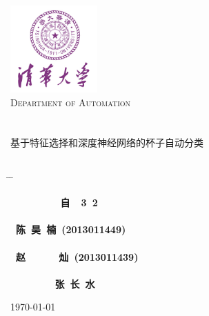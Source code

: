 
\newcommand\smallW{
\mathchoice
	{{\scriptstyle\mathcal{W}}}%
	{{\scriptstyle\mathcal{W}}}%
	{{\scriptscriptstyle\mathcal{W}}}%
	{\scalebox{.7}{$\scriptscriptstyle\mathcal{W}$}}%
}



\begin{titlepage}
\begin{center}
\includegraphics[width=0.25\textwidth]{resource/logo.jpg}\\[1cm]
\textsc{\LARGE Department of Automation}\\[1.5cm]
\\[0.5cm]
\hrulefill
\\[0.8cm]{\centering \huge \hei 基于特征选择和深度神经网络的杯子自动分类}\\[0.4cm]
\hrulefill
\\[4cm]

\begin{tabbing}       %

 \hspace*{5cm} \= \hspace{2.6cm} \= \kill

\>  {\centering\fs\sihao\textbf{~~~~~~~~~自~~3~2}} \\
\\
\>  {\centering\fs\sihao\textbf{~陈~昊~楠~(2013011449)}}\\
\\
\>  {\centering\fs\sihao\textbf{~赵~~~~~~灿~(2013011439)}}\\
\\
\>  {\centering\fs\sihao\textbf{~~~~~~~~张~长~水}} \\

\end{tabbing}
\vfill
{\large \today}
\end{center}
\end{titlepage}

